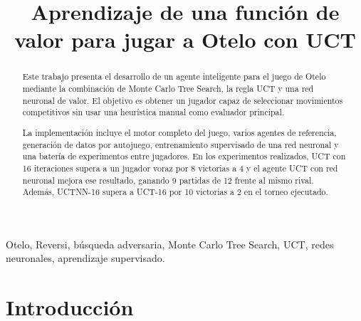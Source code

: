 \documentclass[conference,a4paper]{IEEEtran}
\begin{document}
\title{Aprendizaje de una función de valor para jugar a Otelo con UCT}

\author{
  
  \and
  
}

\maketitle

\begin{abstract}
Este trabajo presenta el desarrollo de un agente inteligente para el juego de
Otelo mediante la combinación de Monte Carlo Tree Search, la regla UCT y una red
neuronal de valor. El objetivo es obtener un jugador capaz de seleccionar
movimientos competitivos sin usar una heurística manual como evaluador principal.

La implementación incluye el motor completo del juego, varios agentes de
referencia, generación de datos por autojuego, entrenamiento supervisado de una
red neuronal y una batería de experimentos entre jugadores. En los experimentos
realizados, UCT con 16 iteraciones supera a un jugador voraz por 8 victorias a 4
y el agente UCT con red neuronal mejora ese resultado, ganando 9 partidas de 12
frente al mismo rival. Además, UCTNN-16 supera a UCT-16 por 10 victorias a 2 en
el torneo ejecutado.
\end{abstract}

\begin{IEEEkeywords}
Otelo, Reversi, búsqueda adversaria, Monte Carlo Tree Search, UCT, redes
neuronales, aprendizaje supervisado.
\end{IEEEkeywords}

\section{Introducción}
\end{document}
